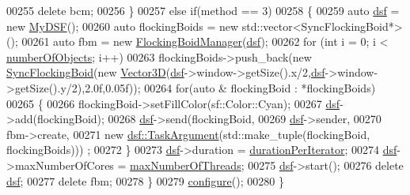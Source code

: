 \begin{DoxyCode}
00255         \textcolor{keyword}{delete} bcm;
00256     \}
00257     \textcolor{keywordflow}{else} \textcolor{keywordflow}{if}(method == 3)
00258     \{
00259         \textcolor{keyword}{auto} \hyperlink{namespacedsf}{dsf} = \textcolor{keyword}{new} \hyperlink{class_my_d_s_f}{MyDSF}();
00260         \textcolor{keyword}{auto} flockingBoids = \textcolor{keyword}{new} std::vector<SyncFlockingBoid*>();
00261         \textcolor{keyword}{auto} fbm = \textcolor{keyword}{new} \hyperlink{class_flocking_boid_manager}{FlockingBoidManager}(\hyperlink{namespacedsf}{dsf});
00262         \textcolor{keywordflow}{for} (\textcolor{keywordtype}{int} i = 0; i < \hyperlink{main_8cpp_a2303e0afaea24a80ed690de888548862}{numberOfObjects}; i++)
00263             flockingBoids->push\_back(\textcolor{keyword}{new} \hyperlink{class_sync_flocking_boid}{SyncFlockingBoid}(\textcolor{keyword}{new} 
      \hyperlink{class_vector3_d}{Vector3D}(\hyperlink{namespacedsf}{dsf}->window->getSize().x/2,\hyperlink{namespacedsf}{dsf}->window->getSize().y/2),2.0f,0.05f));
00264         \textcolor{keywordflow}{for}(\textcolor{keyword}{auto} & flockingBoid : *flockingBoids)
00265         \{
00266             flockingBoid->setFillColor(sf::Color::Cyan);
00267             \hyperlink{namespacedsf}{dsf}->add(flockingBoid);
00268             \hyperlink{namespacedsf}{dsf}->send(flockingBoid,
00269                       \hyperlink{namespacedsf}{dsf}->sender,
00270                       fbm->create,
00271                       \textcolor{keyword}{new} \hyperlink{classyc_1_1_any}{dsf::TaskArgument}(std::make\_tuple(flockingBoid, flockingBoids)))
      ;
00272         \}
00273         \hyperlink{namespacedsf}{dsf}->duration = \hyperlink{main_8cpp_a05d9b1ebdb968e99b310a90811f1be91}{durationPerIterator};
00274         \hyperlink{namespacedsf}{dsf}->maxNumberOfCores = \hyperlink{main_8cpp_a4639134a7fa7033334111ff9d77316f3}{maxNumberOfThreads};
00275         \hyperlink{namespacedsf}{dsf}->start();
00276         \textcolor{keyword}{delete} \hyperlink{namespacedsf}{dsf};
00277         \textcolor{keyword}{delete} fbm;
00278     \}
00279     \hyperlink{main_8cpp_ae369b3765489ee8bd0ea791c1843630f}{configure}();
00280 \}
\end{DoxyCode}
